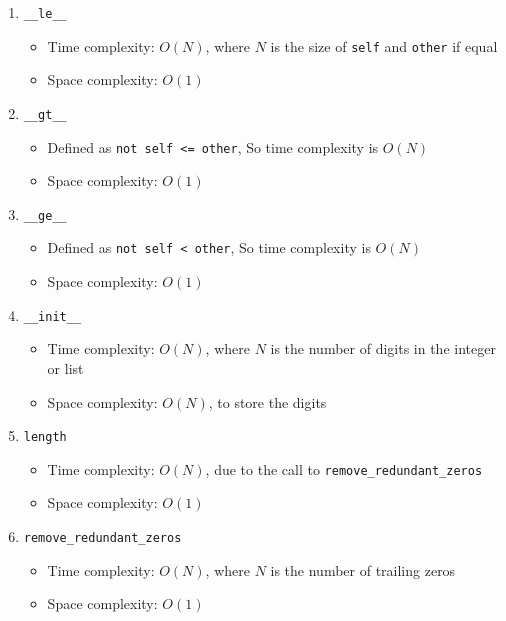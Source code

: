 \documentclass[a4paper]{article}
\begin{document}
\begin{enumerate}
    \item \texttt{\_\_le\_\_}
        \begin{itemize}
            \item Time complexity: \( O(N) \), where \( N \) is the size of \texttt{self} and \texttt{other} if equal
            \item Space complexity: \( O(1) \)
        \end{itemize}

    \item \texttt{\_\_gt\_\_}
        \begin{itemize}
            \item Defined as \texttt{not self <= other}, So time complexity is \( O(N) \)
            \item Space complexity: \( O(1) \)
        \end{itemize}

    \item \texttt{\_\_ge\_\_}
        \begin{itemize}
            \item Defined as \texttt{not self < other}, So time complexity is \( O(N) \)
            \item Space complexity: \( O(1) \)
        \end{itemize}

    \item \texttt{\_\_init\_\_}
        \begin{itemize}
            \item Time complexity: \( O(N) \), where \( N \) is the number of digits in the integer or list
            \item Space complexity: \( O(N) \), to store the digits
        \end{itemize}

    \item \texttt{length}
        \begin{itemize}
            \item Time complexity: \( O(N) \), due to the call to \texttt{remove\_redundant\_zeros}
            \item Space complexity: \( O(1) \)
        \end{itemize}

    \item \texttt{remove\_redundant\_zeros}
        \begin{itemize}
            \item Time complexity: \( O(N) \), where \( N \) is the number of trailing zeros
            \item Space complexity: \( O(1) \)
        \end{itemize}


\end{enumerate}
\end{document}
